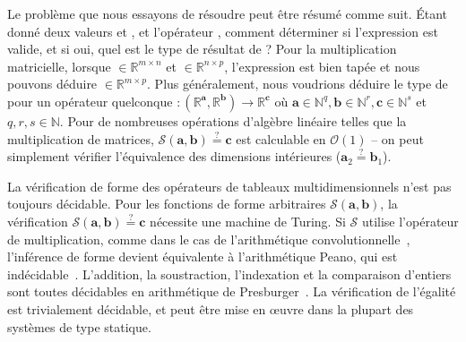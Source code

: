 Le problème que nous essayons de résoudre peut être résumé comme suit. Étant donné deux valeurs  et , et l'opérateur \inline{\$}, comment déterminer si l'expression  est valide, et si oui, quel est le type de résultat de ? Pour la multiplication matricielle, lorsque  $\in \mathbb{R}^{m \times n}$ et  $\in \mathbb{R}^{n \times p}$, l'expression est bien tapée et nous pouvons déduire  $\in \mathbb{R}^{m \times p}$. Plus généralement, nous voudrions déduire le type de  pour un opérateur quelconque  $ : (\mathbb{R}^\mathbf{a}, \mathbb{R}^\mathbf{b}) \rightarrow \mathbb{R}^\mathbf{c}$ où $\mathbf{a} \in \mathbb{N}^q, \mathbf{b} \in \mathbb{N}^r, \mathbf{c} \in \mathbb{N}^s$ et $q, r, s \in \mathbb{N}$. Pour de nombreuses opérations d'algèbre linéaire telles que la multiplication de matrices, $\mathcal{S}(\mathbf a, \mathbf b) \stackrel{?}{=} \mathbf c$ est calculable en $\mathcal{O}(1)$ -- on peut simplement vérifier l'équivalence des dimensions intérieures ($\mathbf{a}_2 \stackrel{?}{=} \mathbf{b}_1$).

La vérification de forme des opérateurs de tableaux multidimensionnels n'est pas toujours décidable. Pour les fonctions de forme arbitraires $\mathcal{S}(\mathbf{a}, \mathbf{b})$, la vérification $\mathcal{S}(\mathbf{a}, \mathbf{b}) \stackrel{?}{=} \mathbf{c}$ nécessite une machine de Turing. Si $\mathcal{S}$ utilise l'opérateur de multiplication, comme dans le cas de l'arithmétique convolutionnelle~\citep{dumoulin2016guide}, l'inférence de forme devient équivalente à l'arithmétique Peano, qui est indécidable~\citep{godel1931formel}. L'addition, la soustraction, l'indexation et la comparaison d'entiers sont toutes décidables en arithmétique de Presburger~\citep{suzuki1980vérification, bradley2006décidable, charlier2011énumération}. La vérification de l'égalité est trivialement décidable, et peut être mise en œuvre dans la plupart des systèmes de type statique.

